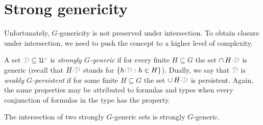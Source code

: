 \begin{comment}
\begin{proof}
  \ssf1$\IMP$\ssf2.
  Pick any ${\mr a}\in\mrC\cap\mrX$.
  We can assume that $\mrC=\epsilon(\U^{\mr x}\,;{\mr a})$ is an equivalence class of some finite equivalence relation $\epsilon({\mr x}\,;{\mr y})\in L(A)$ 
  As $G$ acts transitively on $\mrX$ the orbit of $\mrC$ coves $\mrX$.
  Therefore $\mrC\subseteq\mrD$, and a fortiori $\mrD$, is $G$-generic.

  \ssf2$\IMP$\ssf1.
  Let $Q$ be as in Lemma~\ref{lem_trans_action}.
  Pick any $q({\mr x})\in Q$.
  By genericity $q({\mr x})\proves{\mr x}\in g{\cdot}\mrD$ for some $g\in G$.
  Then $g^{-1}\!\cdot q({\mr x})\proves{\mr x}\in \mrD$.
  Pick any ${\mr a}\models g^{-1}\!\cdot q({\mr x})$.
  As $g^{-1}\!\cdot q({\mr x})\in Q$, by the second claim in the lemma and compactness,  $\epsilon(\U^{\mr x}\,;{\mr a})\subseteq\mrD$ for some finite equivalence relation $\epsilon({\mr x}\,;{\mr y})\in\GDelta(A)$.
\end{proof}
\end{comment}

\section{Strong genericity}\label{strong_genericity}

Unfortunately, $G$-genericity is not preserved under intersection.
To obtain closure under intersection, we need to push the concept to a higher level of complexity.

A set ${\color{brown}\EuScript D}\subseteq\EuScript U^{\color{brown} x}$ is \emph{strongly $G$-generic\/} if for every finite $H\subseteq G$ the set $\cap\,H{\cdot}{\color{brown}\EuScript D}$ is generic (recall that $H{\cdot}{\color{brown}\EuScript D}$ stands for $\{h{\cdot}{\color{brown}\EuScript D}: h\in H\}$).
Dually, we say that ${\color{brown}\EuScript D}$ is \emph{weakly $G$-persistent\/} if for some finite $H\subseteq G$ the set $\cup\,H{\cdot}{\color{brown}\EuScript D}$ is persistent.
Again, the same properties may be attributed to formulas and types when every conjunction of formulas in the type has the property.

\begin{lemma}\label{lem_strongly_generic}
  The intersection of two strongly $G$-generic sets is strongly $G$-generic.
\end{lemma}

